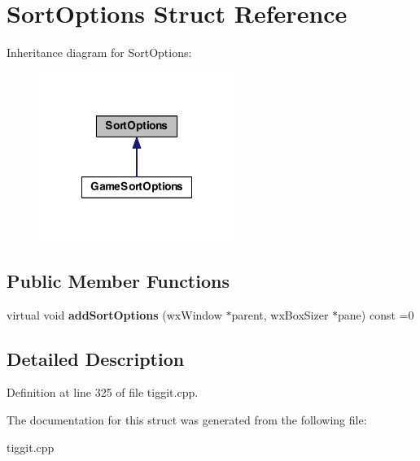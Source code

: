 \hypertarget{struct_sort_options}{\section{Sort\-Options Struct Reference}
\label{struct_sort_options}
}


Inheritance diagram for Sort\-Options\-:
\nopagebreak
\begin{figure}[H]
\begin{center}
\leavevmode
\includegraphics[width=180pt]{struct_sort_options__inherit__graph}
\end{center}
\end{figure}
\subsection*{Public Member Functions}
\begin{DoxyCompactItemize}
\item 
\hypertarget{struct_sort_options_a717e586bc0927918693720ae30a66394}{virtual void {\bfseries add\-Sort\-Options} (wx\-Window $\ast$parent, wx\-Box\-Sizer $\ast$pane) const =0}\label{struct_sort_options_a717e586bc0927918693720ae30a66394}

\end{DoxyCompactItemize}


\subsection{Detailed Description}


Definition at line 325 of file tiggit.\-cpp.



The documentation for this struct was generated from the following file\-:\begin{DoxyCompactItemize}
\item 
tiggit.\-cpp\end{DoxyCompactItemize}
